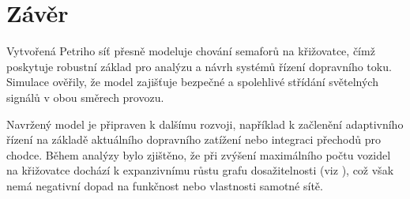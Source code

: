 \section*{Závěr}
\label{sec:summary}

Vytvořená Petriho síť přesně modeluje chování semaforů na křižovatce, čímž poskytuje robustní základ pro analýzu a návrh systémů řízení dopravního toku.
Simulace ověřily, že model zajišťuje bezpečné a spolehlivé střídání světelných signálů v obou směrech provozu.

Navržený model je připraven k dalšímu rozvoji, například k začlenění adaptivního řízení na základě aktuálního dopravního zatížení nebo integraci přechodů pro chodce.
Během analýzy bylo zjištěno, že při zvýšení maximálního počtu vozidel na křižovatce dochází k expanzivnímu růstu grafu dosažitelnosti (viz ), což však nemá negativní dopad na funkčnost nebo vlastnosti samotné sítě.

\endinput